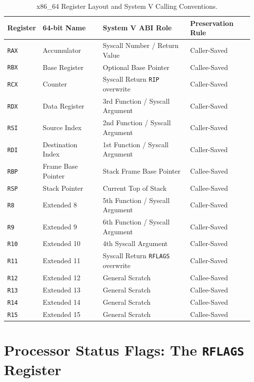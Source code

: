 \begin{table}[htbp]
\centering
\small
\begin{tabular}{llll}
\toprule
\textbf{Register} & \textbf{64-bit Name} & \textbf{System V ABI Role} & \textbf{Preservation Rule} \\
\midrule
\texttt{RAX} & Accumulator & Syscall Number / Return Value & Caller-Saved \\
\texttt{RBX} & Base Register & Optional Base Pointer & Callee-Saved \\
\texttt{RCX} & Counter & Syscall Return \texttt{RIP} overwrite & Caller-Saved \\
\texttt{RDX} & Data Register & 3rd Function / Syscall Argument & Caller-Saved \\
\texttt{RSI} & Source Index & 2nd Function / Syscall Argument & Caller-Saved \\
\texttt{RDI} & Destination Index & 1st Function / Syscall Argument & Caller-Saved \\
\texttt{RBP} & Frame Base Pointer & Stack Frame Base Pointer & Callee-Saved \\
\texttt{RSP} & Stack Pointer & Current Top of Stack & Callee-Saved \\
\texttt{R8} & Extended 8 & 5th Function / Syscall Argument & Caller-Saved \\
\texttt{R9} & Extended 9 & 6th Function / Syscall Argument & Caller-Saved \\
\texttt{R10} & Extended 10 & 4th Syscall Argument & Caller-Saved \\
\texttt{R11} & Extended 11 & Syscall Return \texttt{RFLAGS} overwrite & Caller-Saved \\
\texttt{R12} & Extended 12 & General Scratch & Callee-Saved \\
\texttt{R13} & Extended 13 & General Scratch & Callee-Saved \\
\texttt{R14} & Extended 14 & General Scratch & Callee-Saved \\
\texttt{R15} & Extended 15 & General Scratch & Callee-Saved \\
\bottomrule
\end{tabular}
\caption{x86\_64 Register Layout and System V Calling Conventions.}
\label{tab:gpr_calling}
\end{table}

\section{Processor Status Flags: The \texttt{RFLAGS} Register}
\label{sec:rflags_ref}

